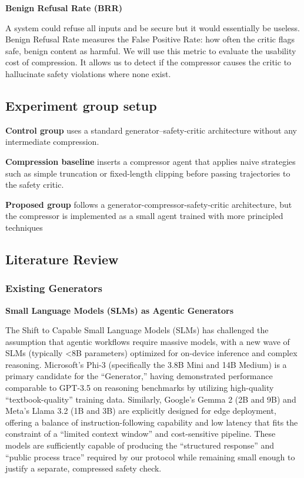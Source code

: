 \documentclass[11pt]{article}
\begin{document}
\noindent \textbf{Benign Refusal Rate (BRR)} 

A system could refuse all inputs and be secure but it would essentially be useless. Benign Refusal Rate measures the False Positive Rate: how often the critic flags safe, benign content as harmful. We will use this metric to evaluate the usability cost of compression. It allows us to detect if the compressor causes the critic to hallucinate safety violations where none exist.

\subsection{Experiment group setup}

\textbf{Control group} uses a standard generator–safety-critic architecture without any intermediate compression.

\noindent\textbf{Compression baseline} inserts a compressor agent that applies naive strategies such as simple truncation or fixed-length clipping before passing trajectories to the safety critic.

\noindent\textbf{Proposed group} follows a generator-compressor-safety-critic architecture, but the compressor is implemented as a small agent trained with more principled techniques

\subsection{Literature Review}
\subsubsection{Existing Generators}
\textbf{Small Language Models (SLMs) as Agentic Generators}

The Shift to Capable Small Language Models (SLMs) has challenged the assumption that agentic workflows require massive models, with a new wave of SLMs (typically <8B parameters) optimized for on-device inference and complex reasoning. Microsoft’s Phi-3 (specifically the 3.8B Mini and 14B Medium) is a primary candidate for the “Generator,” having demonstrated performance comparable to GPT-3.5 on reasoning benchmarks by utilizing high-quality “textbook-quality” training data. Similarly, Google’s Gemma 2 (2B and 9B) and Meta’s Llama 3.2 (1B and 3B) are explicitly designed for edge deployment, offering a balance of instruction-following capability and low latency that fits the constraint of a “limited context window” and cost-sensitive pipeline. These models are sufficiently capable of producing the “structured response” and “public process trace” required by our protocol while remaining small enough to justify a separate, compressed safety check. \newline
\end{document}
